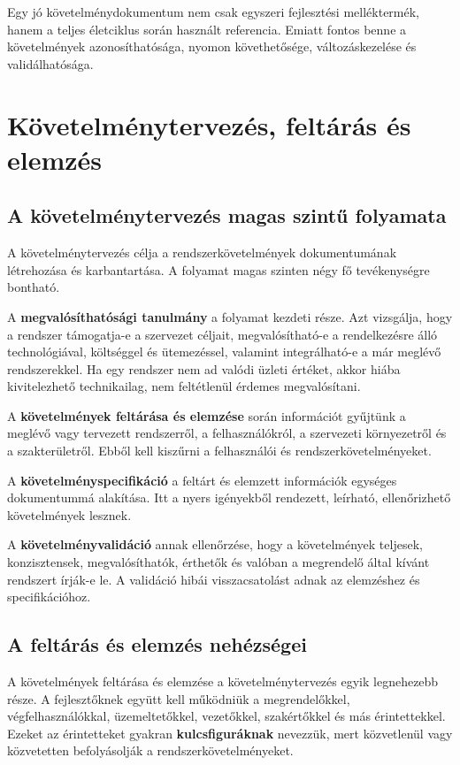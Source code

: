 Egy jó követelménydokumentum nem csak egyszeri fejlesztési melléktermék, hanem a teljes életciklus során használt referencia. Emiatt fontos benne a követelmények azonosíthatósága, nyomon követhetősége, változáskezelése és validálhatósága.

\section{Követelménytervezés, feltárás és elemzés}

\subsection{A követelménytervezés magas szintű folyamata}

A követelménytervezés célja a rendszerkövetelmények dokumentumának létrehozása és karbantartása. A folyamat magas szinten négy fő tevékenységre bontható.



A \textbf{megvalósíthatósági tanulmány} a folyamat kezdeti része. Azt vizsgálja, hogy a rendszer támogatja-e a szervezet céljait, megvalósítható-e a rendelkezésre álló technológiával, költséggel és ütemezéssel, valamint integrálható-e a már meglévő rendszerekkel. Ha egy rendszer nem ad valódi üzleti értéket, akkor hiába kivitelezhető technikailag, nem feltétlenül érdemes megvalósítani.

A \textbf{követelmények feltárása és elemzése} során információt gyűjtünk a meglévő vagy tervezett rendszerről, a felhasználókról, a szervezeti környezetről és a szakterületről. Ebből kell kiszűrni a felhasználói és rendszerkövetelményeket.

A \textbf{követelményspecifikáció} a feltárt és elemzett információk egységes dokumentummá alakítása. Itt a nyers igényekből rendezett, leírható, ellenőrizhető követelmények lesznek.

A \textbf{követelményvalidáció} annak ellenőrzése, hogy a követelmények teljesek, konzisztensek, megvalósíthatók, érthetők és valóban a megrendelő által kívánt rendszert írják-e le. A validáció hibái visszacsatolást adnak az elemzéshez és specifikációhoz.

\subsection{A feltárás és elemzés nehézségei}

A követelmények feltárása és elemzése a követelménytervezés egyik legnehezebb része. A fejlesztőknek együtt kell működniük a megrendelőkkel, végfelhasználókkal, üzemeltetőkkel, vezetőkkel, szakértőkkel és más érintettekkel. Ezeket az érintetteket gyakran \textbf{kulcsfiguráknak} nevezzük, mert közvetlenül vagy közvetetten befolyásolják a rendszerkövetelményeket.

